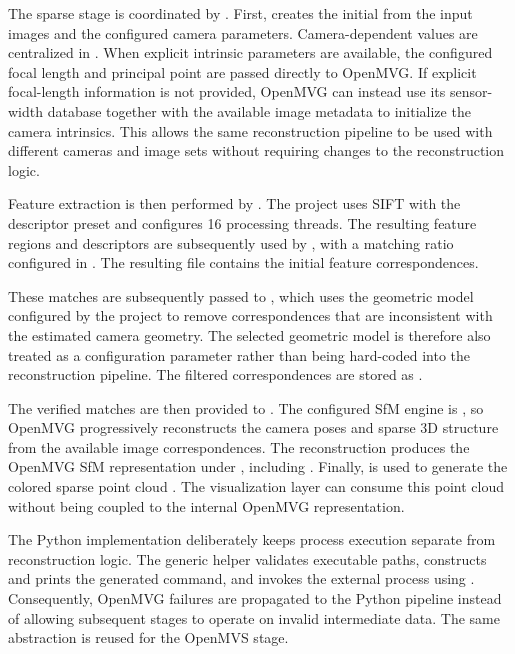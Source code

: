 The sparse stage is coordinated by
. First,
 creates the initial
 from the input images and the configured camera
parameters. Camera-dependent values are centralized in
. When explicit intrinsic parameters are available, the
configured focal length and principal point are passed directly to OpenMVG.
If explicit focal-length information is not provided, OpenMVG can instead
use its sensor-width database together with the available image metadata to
initialize the camera intrinsics. This allows the same reconstruction
pipeline to be used with different cameras and image sets without requiring
changes to the reconstruction logic.


Feature extraction is then performed by
. The project uses SIFT with the
 descriptor preset and configures 16 processing threads. The
resulting feature regions and descriptors are subsequently used by
, with a matching ratio configured in
. The resulting  file contains
the initial feature correspondences.

These matches are subsequently passed to
, which uses the geometric model
configured by the project to remove correspondences that are inconsistent
with the estimated camera geometry. The selected geometric model is therefore
also treated as a configuration parameter rather than being hard-coded into
the reconstruction pipeline. The filtered correspondences are stored as
.

The verified matches are then provided to
. The configured SfM engine is
, so OpenMVG progressively reconstructs the camera poses
and sparse 3D structure from the available image correspondences. The
reconstruction produces the OpenMVG SfM representation under
, including . Finally,
 is used to generate the colored
sparse point cloud . The visualization layer can
consume this point cloud without being coupled to the internal OpenMVG
representation.

The Python implementation deliberately keeps process execution separate from
reconstruction logic. The generic  helper validates
executable paths, constructs and prints the generated command, and invokes
the external process using .
Consequently, OpenMVG failures are propagated to the Python pipeline instead
of allowing subsequent stages to operate on invalid intermediate data. The
same abstraction is reused for the OpenMVS stage.

